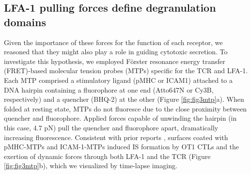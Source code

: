 \subsection{LFA-1 pulling forces define degranulation domains}
Given the importance of these forces for the function of each receptor, we reasoned that they might also play a role in guiding cytotoxic secretion. To investigate this hypothesis, we employed F\"{o}rster resonance energy transfer (FRET)-based molecular tension probes (MTPs) \cite{Liu2016_2} specific for the TCR and LFA-1. Each MTP comprised a stimulatory ligand (pMHC or ICAM1) attached to a DNA hairpin containing a fluorophore at one end (Atto647N or Cy3B, respectively) and a quencher (BHQ-2) at the other (Figure \ref{fig:fig3mtp}a). When folded at resting state, MTPs do not fluoresce due to the close proximity between quencher and fluorophore. Applied forces capable of unwinding the hairpin (in this case, 4.7 pN) pull the quencher and fluorophore apart, dramatically increasing fluorescence. Consistent with prior reports \cite{Liu2016_2, Zhang2014}, surfaces coated with pMHC-MTPs and ICAM-1-MTPs induced IS formation by OT1 CTLs and the exertion of dynamic forces through both LFA-1 and the TCR (Figure \ref{fig:fig3mtp}b), which we visualized by time-lapse imaging. 

